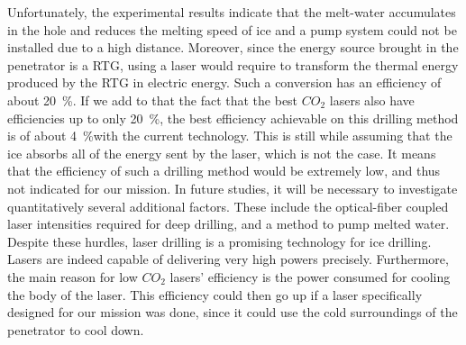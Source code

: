 Unfortunately, the experimental results indicate that the melt-water accumulates in the hole and reduces the melting speed of ice and a pump system could not be installed due to a high distance.
Moreover, since the energy source brought in the penetrator is a RTG, using a laser would require to transform the thermal energy produced by the RTG in electric energy. Such a conversion has an efficiency of about 20~\%. If we add to that the fact that the best $CO_{2}$ lasers also have efficiencies up to only 20~\%, the best efficiency achievable on this drilling method is of about 4~\%with the current technology. This is still while assuming that the ice absorbs all of the energy sent by the laser, which is not the case. It means that the efficiency of such a drilling method would be extremely low, and thus not indicated for our mission.
In future studies, it will be necessary to investigate quantitatively several additional factors. These include the optical-fiber coupled laser intensities required for deep drilling, and a method to pump melted water. Despite these hurdles, laser drilling is a promising technology for ice drilling. Lasers are indeed capable of delivering very high powers precisely. Furthermore, the main reason for low $CO_{2}$ lasers' efficiency is the power consumed for cooling the body of the laser. This efficiency could then go up if a laser specifically designed for our mission was done, since it could use the cold surroundings of the penetrator to cool down.